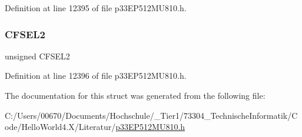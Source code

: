 Definition at line 12395 of file p33\+E\+P512\+M\+U810.\+h.

\mbox{\label{structtag_c_m1_f_l_t_r_b_i_t_s_a136e38e2a181ec59b7952e0a8e019fc4}} 
\subsubsection{\texorpdfstring{C\+F\+S\+E\+L2}{CFSEL2}}
{\footnotesize\ttfamily unsigned C\+F\+S\+E\+L2}



Definition at line 12396 of file p33\+E\+P512\+M\+U810.\+h.



The documentation for this struct was generated from the following file\+:\begin{DoxyCompactItemize}
\item 
C\+:/\+Users/00670/\+Documents/\+Hochschule/\+\_\+\+Tier1/73304\+\_\+\+Technische\+Informatik/\+Code/\+Hello\+World4.\+X/\+Literatur/\hyperlink{p33_e_p512_m_u810_8h}{p33\+E\+P512\+M\+U810.\+h}\end{DoxyCompactItemize}
